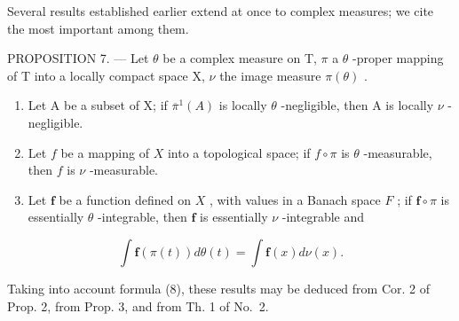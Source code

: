 Several results established earlier extend at once to complex measures; we cite the most important among them.

PROPOSITION 7. --- Let \(\theta\) be a complex measure on T, \(\pi\) a \(\theta\) -proper mapping of T into a locally compact space X, \(\nu\) the image measure \(\pi(\theta)\) .

\begin{enumerate}
\def\labelenumi{\alph{enumi})}
\item
  Let A be a subset of X; if \(\overline{\pi}^{1}(A)\) is locally \(\theta\) -negligible, then A is locally \(\nu\) -negligible.
\item
  Let \(f\) be a mapping of \(X\) into a topological space; if \(f \circ \pi\) is \(\theta\) -measurable, then \(f\) is \(\nu\) -measurable.
\item
  Let \(\mathbf{f}\) be a function defined on \(X\) , with values in a Banach space \(F\) ; if \(\mathbf{f} \circ \pi\) is essentially \(\theta\) -integrable, then \(\mathbf{f}\) is essentially \(\nu\) -integrable and
\end{enumerate}

\[
\int \mathbf {f} (\pi (t)) d \theta (t) = \int \mathbf {f} (x) d \nu (x).\tag{10}
\]

Taking into account formula (8), these results may be deduced from Cor. 2 of Prop. 2, from Prop. 3, and from Th. 1 of No.~2.

